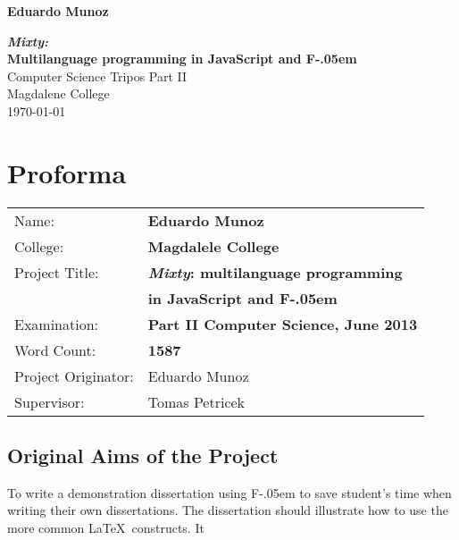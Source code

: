 \documentclass[12pt, a4paper, twoside, openright, notitlepage]{report}
\newcommand{\fs}{{\settoheight{\dimen0}{C}F\kern-.05em \resizebox{!}{\dimen0}{\raisebox{\depth}{\#}}}}
\begin{document}


\pagestyle{empty}

\hfill{\LARGE \textbf{Eduardo Munoz}}

\vspace*{60mm}
\begin{center}
\Huge
{\textbf{\emph{Mixty:}\\ Multilanguage programming in JavaScript and \fs}} \\
\vspace*{5mm}
Computer Science Tripos Part II \\
\vspace*{5mm}
Magdalene College \\
\vspace*{5mm}
\today  %
\end{center}

\cleardoublepage


\setcounter{page}{1}
\pagestyle{plain}

\chapter*{Proforma}


{\large
\begin{tabular}{ l l }
Name:               & \textbf{Eduardo Munoz} \\
College:            & \textbf{Magdalele College}  \\
Project Title:      & \textbf{\emph{Mixty}: multilanguage programming} \\
                    & \textbf{in JavaScript and \fs} \\
Examination:        & \textbf{Part II Computer Science, June 2013} \\
Word Count:         & \textbf{\bf 1587} \\
Project Originator: & Eduardo Munoz \\
Supervisor:         & Tomas Petricek \\ 
\end{tabular}
}

\section*{Original Aims of the Project}
To write a demonstration dissertation using \fs to save
student's time when writing their own dissertations. The dissertation
should illustrate how to use the more common \LaTeX\ constructs. It
\end{document}
